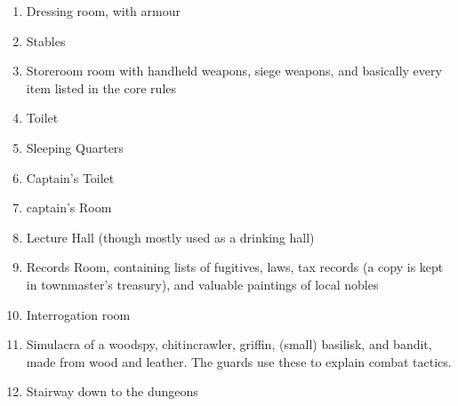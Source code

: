 \begin{multicols}{2}
\begin{enumerate}
  \item
  Dressing room, with armour
  \label{stationDressing}
  \item
  Stables\label{stationStables}
  \item
  Storeroom room with handheld weapons, siege weapons, and basically every item listed in the core rules
  \label{stationStorage}
  \item
  Toilet
  \label{stationToilet}
  \item
  Sleeping Quarters
  \label{stationSleep}
  \item
  Captain's Toilet
  \label{stationCaptainToilet}
  \item
  \gls{captain}'s Room
  \label{stationCaptainRoom}
  \item
  Lecture Hall (though mostly used as a drinking hall)
  \label{stationLecture}
  \item
  Records Room, containing lists of fugitives, laws, tax records (a copy is kept in \gls{townmaster}'s treasury), and valuable paintings of local nobles
  \label{stationRecords}
  \item
  Interrogation room
  \label{stationInterrogation}
  \item
  Simulacra of a woodspy, chitincrawler, griffin, (small) basilisk, and bandit, made from wood and leather.
  The guards use these to explain combat tactics.
  \label{stationShrine}
  \item
  Stairway down to the dungeons
  \label{stationStairs}
\end{enumerate}

\end{multicols}
